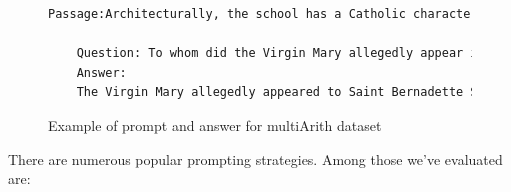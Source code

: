 \documentclass[fleqn,moreauthors,10pt]{ds_report}
\begin{document}
\begin{itemize}
    \begin{figure}[htbp]
    \centering
    \begin{lstlisting}[language=TeX]
    Passage:Architecturally, the school has a Catholic character. Atop the Main Building's gold dome is a golden statue of the Virgin Mary. Immediately in front of the Main Building and facing it, is a copper statue of Christ with arms upraised with the legend "Venite Ad Me Omnes".

    Question: To whom did the Virgin Mary allegedly appear in 1858 in Lourdes France?
    Answer:
    The Virgin Mary allegedly appeared to Saint Bernadette Soubirous in 1858 in Lourdes, France.
    \end{lstlisting}
    \caption{Example of prompt and answer for multiArith dataset}
    \label{text:squad}
    \end{figure}
    
\end{itemize}

There are numerous popular prompting strategies. Among those we've evaluated are:
\end{document}
